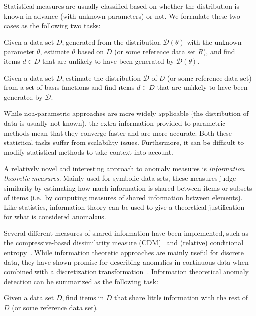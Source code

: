 Statistical measures are usually classified based on whether the distribution is known in advance (with unknown parameters) or not. We formulate these two cases as the following two tasks:
\begin{task}
  Given a data set $D$, generated from the distribution $\mathcal{D}(\theta)$ with the unknown parameter $\theta$, estimate $\theta$ based on $D$ (or some reference data set $R$), and find items $d \in D$ that are unlikely to have been generated by $\mathcal{D}(\theta)$.
\end{task}
\begin{task}
  Given a data set $D$, estimate the distribution $\mathcal{D}$ of $D$ (or some reference data set) from a set of basis functions and find items $d \in D$ that are unlikely to have been generated by $\mathcal{D}$.
\end{task}
While non-parametric approaches are more widely applicable (the distribution of data is usually not known), the extra information provided to parametric methods mean that they converge faster and are more accurate. Both these statistical tasks suffer from scalability issues. Furthermore, it can be difficult to modify statistical methods to take context into account.

A relatively novel and interesting approach to anomaly measures is \emph{information theoretic measures}. Mainly used for symbolic data sets, these measures judge similarity by estimating how much information is shared between items or subsets of items (i.e.\ by computing measures of shared information between elements). Like statistics, information theory can be used to give a theoretical justification for what is considered anomalous.

Several different measures of shared information have been implemented, such as the compressive-based dissimilarity measure (CDM)~\cite{keogh2} and (relative) conditional entropy~\cite{xiang}. While information theoretic approaches are mainly useful for discrete data, they have shown promise for describing anomalies in continuous data when combined with a discretization transformation~\cite{keogh2}. Information theoretical anomaly detection can be summarized as the following task:

\begin{task}
  Given a data set $D$, find items in $D$ that share little information with the rest of $D$ (or some reference data set).
\end{task}

